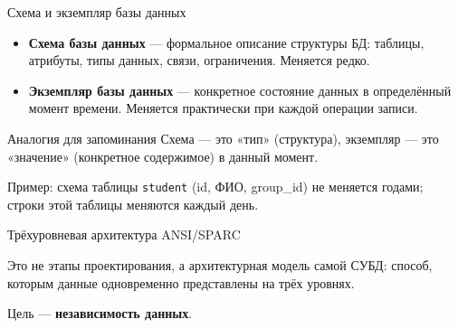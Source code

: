 \documentclass[aspectratio=169]{beamer}
\begin{document}
\begin{frame}{Схема и экземпляр базы данных}

\begin{itemize}
  \item \textbf{Схема базы данных} — формальное описание
        структуры БД: таблицы, атрибуты, типы данных,
        связи, ограничения. Меняется редко.
  \item \textbf{Экземпляр базы данных} — конкретное состояние
        данных в определённый момент времени. Меняется
        практически при каждой операции записи.
\end{itemize}

\vspace{0.4cm}

\begin{alertblock}{Аналогия для запоминания}
Схема — это «тип» (структура), экземпляр — это «значение»
(конкретное содержимое) в данный момент.
\end{alertblock}

\vspace{0.2cm}
\footnotesize
Пример: схема таблицы \texttt{student} (id, ФИО, group\_id)
не меняется годами; строки этой таблицы меняются
каждый день.

\end{frame}


\begin{frame}{Трёхуровневая архитектура ANSI/SPARC}

Это не этапы проектирования, а архитектурная модель
самой СУБД: способ, которым данные одновременно
представлены на трёх уровнях.

\begin{center}
\end{center}

\begin{center}
Цель — \textbf{независимость данных}.
\end{center}

\end{frame}
\end{document}
